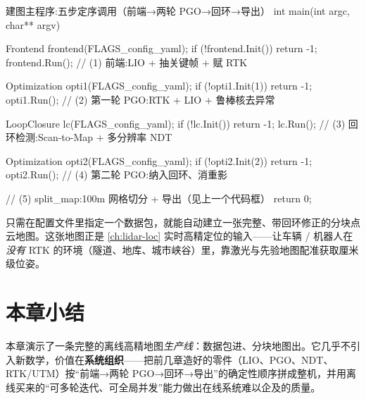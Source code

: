 \begin{codebox}[C++]{建图主程序:五步定序调用（前端→两轮 PGO→回环→导出）}
int main(int argc, char** argv) {
  Frontend frontend(FLAGS_config_yaml);
  if (!frontend.Init()) return -1;
  frontend.Run();                                  // (1) 前端:LIO + 抽关键帧 + 赋 RTK

  Optimization opti1(FLAGS_config_yaml);
  if (!opti1.Init(1)) return -1;
  opti1.Run();                                     // (2) 第一轮 PGO:RTK + LIO + 鲁棒核去异常

  LoopClosure lc(FLAGS_config_yaml);
  if (!lc.Init()) return -1;
  lc.Run();                                        // (3) 回环检测:Scan-to-Map + 多分辨率 NDT

  Optimization opti2(FLAGS_config_yaml);
  if (!opti2.Init(2)) return -1;
  opti2.Run();                                     // (4) 第二轮 PGO:纳入回环、消重影

  // (5) split_map:100m 网格切分 + 导出（见上一个代码框）
  return 0;
}
\end{codebox}

只需在配置文件里指定一个数据包，就能自动建立一张完整、带回环修正的分块点云地图。这张地图正是 \cref{ch:lidar-loc} 实时高精定位的输入——让车辆 / 机器人在\emph{没有} RTK 的环境（隧道、地库、城市峡谷）里，靠激光与先验地图配准获取厘米级位姿。

\section{本章小结}
\label{sec:lidar-map-summary}

本章演示了一条完整的离线高精地图\emph{生产线}：数据包进、分块地图出。它几乎不引入新数学，价值在\textbf{系统组织}——把前几章造好的零件（LIO、PGO、NDT、RTK/UTM）按“前端→两轮 PGO→回环→导出”的确定性顺序拼成整机，并用离线买来的“可多轮迭代、可全局并发”能力做出在线系统难以企及的质量。

